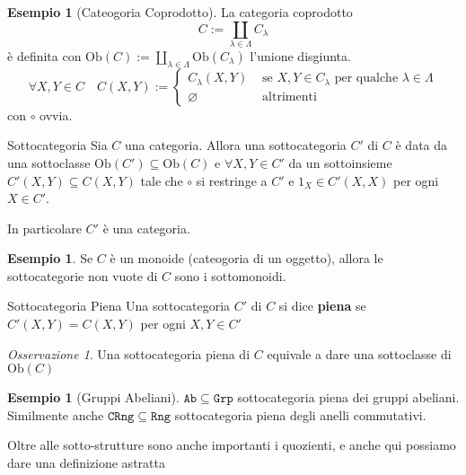 \documentclass[notitlepage]{report}
\newcounter{theo}[section]\setcounter{theo}{0}
\newcounter{excounter}[section]\setcounter{excounter}{0}
\numberwithin{equation}{section}
\theoremstyle{plain}
\theoremstyle{definition}
\newtheorem{example}[excounter]{Esempio}
\theoremstyle{remark}
\newtheorem*{remark}{Osservazione}
\begin{document}
\begin{example}[Cateogoria Coprodotto]
    La categoria coprodotto
    \[
      C := \coprod_{\lambda \in \Lambda} C_{\lambda} 
    \]
    è definita con \(\mathrm{Ob}{(C)} := \coprod_{\lambda \in \Lambda} \mathrm{Ob}{(C_{\lambda} )}\) l'unione disgiunta. 
    \[
      \forall X, Y \in C \quad C{(X, Y)} := \begin{cases}{}
          C_{\lambda} {(X, Y)} & \text{ se } X, Y \in C_{\lambda} \text{ per
          qualche } \lambda \in \Lambda \\
              \varnothing & \text{ altrimenti}
      \end{cases}
    \]
    con \(\circ\) ovvia.
\end{example}

\begin{definition}{Sottocategoria}
    Sia \(C\) una categoria. Allora una sottocategoria \(C'\) di \(C\) è data
    da una sottoclasse \(\mathrm{Ob}{(C')} \subseteq \mathrm{Ob}{(C)} \) e \(\forall X, Y \in C'\) da un sottoinsieme \(C'{(X, Y)} \subseteq C{(X, Y)} \) tale che \(\circ\) si restringe a \(C'\) e \(1_X \in C'{(X, X)}\) per ogni \(X \in C'\).

    In particolare \(C'\) è una categoria.
\end{definition}

\begin{example}{}
    Se \(C\) è un monoide (cateogoria di un oggetto), allora le sottocategorie
    non vuote di \(C\) sono i sottomonoidi.
\end{example}

\begin{definition}{Sottocategoria Piena}
    Una sottocategoria \(C'\) di \(C\) si dice \textbf{piena} se \(C'{(X, Y)} =
    C{(X, Y)}\) per ogni \(X, Y \in C'\) 
\end{definition}

\begin{remark}{}
    Una sottocategoria piena di \(C\) equivale a dare una sottoclasse di \(\mathrm{Ob}{(C)}\) 
\end{remark}

\begin{example}[Gruppi Abeliani]
    \(\mathtt{Ab} \subseteq \mathtt{Grp} \) sottocategoria piena dei gruppi
    abeliani. Similmente anche \(\mathtt{CRng} \subseteq \mathtt{Rng} \)
    sottocategoria piena degli anelli commutativi.
\end{example}

Oltre alle sotto-strutture sono anche importanti i quozienti, e anche qui
possiamo dare una definizione astratta
\end{document}
